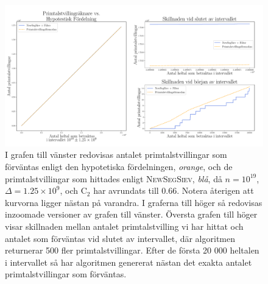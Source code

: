 \begin{figure}[H]
    \centering
    \includegraphics[width = \textwidth]{coen/Images/TwinPrimesNoKapp.pdf}
    \caption{I grafen till vänster redovisas antalet primtalstvillingar som förväntas enligt den hypotetiska fördelningen, \textit{orange}, och de primtalstvillingar som hittades enligt \textsc{NewSegSiev}, \textit{blå}, då \(n = 10^{19}\), \(\Delta = 1.25\times10^9\), och \(\text{C}_2\) har avrundats till 0.66. Notera återigen att kurvorna ligger nästan på varandra. I graferna till höger så redovisas inzoomade versioner av grafen till vänster. 
    Översta grafen till höger visar skillnaden mellan antalet primtalstvilling vi har hittat och antalet som förväntas vid slutet av intervallet, där algoritmen returnerar 500 fler primtalstvillingar. Efter de första 20 000 heltalen i intervallet så har algoritmen genererat nästan det exakta antalet primtalstvillingar som förväntas.}
    \label{fig:res.twins}
\end{figure}

